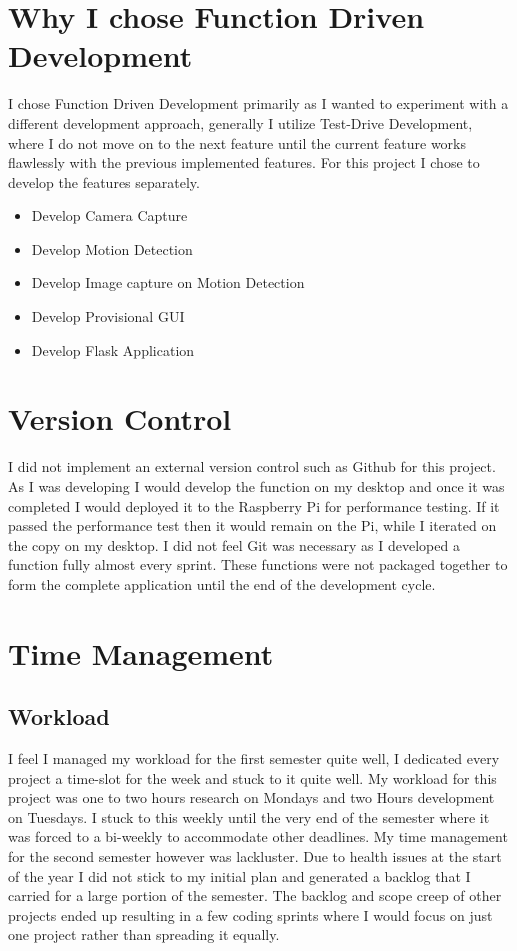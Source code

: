 \section{Why I chose Function Driven Development}
I chose Function Driven Development primarily as I wanted to experiment with a different development approach, generally I utilize Test-Drive Development, where I do not move on to the next feature until the current feature works flawlessly with the previous implemented features. For this project I chose to develop the features separately.
\begin{itemize}
    \item Develop Camera Capture
    \item Develop Motion Detection
    \item Develop Image capture on Motion Detection
    \item Develop Provisional GUI
    \item Develop Flask Application
\end{itemize}
\section{Version Control}
I did not implement an external version control such as Github for this project. As I was developing I would develop the function on my desktop and once it was completed I would deployed it to the Raspberry Pi for performance testing. If it passed the performance test then it would remain on the Pi, while I iterated on the copy on my desktop. I did not feel Git was necessary as I developed a function fully almost every sprint. These functions were not packaged together to form the complete application until the end of the development cycle.
\section{Time Management}
\subsection{Workload}
I feel I managed my workload for the first semester quite well, I dedicated every project a time-slot for the week and stuck to it quite well. My workload for this project was one to two hours research on Mondays and two Hours development on Tuesdays. I stuck to this weekly until the very end of the semester where it was forced to a bi-weekly to accommodate other deadlines. My time management for the second semester however was lackluster. Due to health issues at the start of the year I did not stick to my initial plan and generated a backlog that I carried for a large portion of the semester. The backlog and scope creep of other projects ended up resulting in a few coding sprints where I would focus on just one project rather than spreading it equally.


